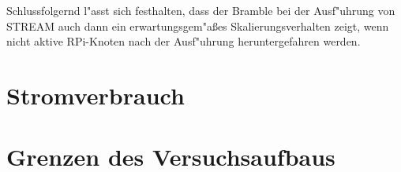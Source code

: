 Schlussfolgernd l"asst sich festhalten, dass der Bramble bei der Ausf"uhrung von STREAM auch dann ein erwartungsgem"a\ss es Skalierungsverhalten zeigt, wenn nicht aktive RPi-Knoten nach der Ausf"uhrung heruntergefahren werden.  

\section{Stromverbrauch}


\section{Grenzen des Versuchsaufbaus}\label{Grenzen}

